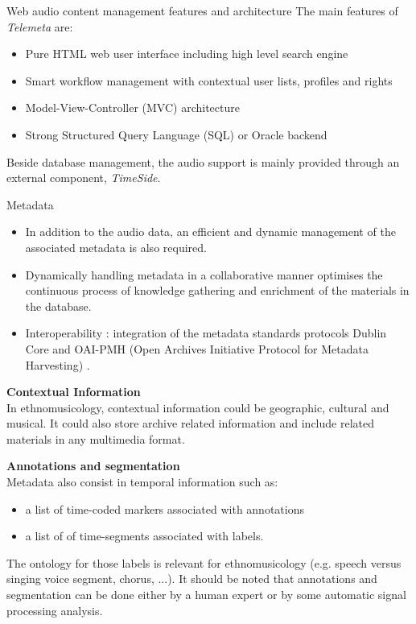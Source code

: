 \documentclass[final, hyperref, table]{beamer}
\begin{document}
\begin{frame}[containsverbatim]{}
\begin{columns}[T]
\begin{column}[T]{.49\linewidth}
\begin{block}{Web audio content management features and architecture}
        The main features of \emph{Telemeta} are:
        \vspace{-0.1cm}
        \begin{itemize}
        \item \alert{Pure HTML} web user interface including high level \alert{search engine}
        \item \alert{Smart workflow management} with contextual user lists, profiles and rights
        \item Model-View-Controller (\alert{MVC}) architecture 
        \item Strong Structured Query Language (\alert{SQL}) or Oracle backend
        \end{itemize}
        Beside database management, the audio support is mainly provided through an external component, \emph{TimeSide}.
        
      \end{block}
      \begin{block}{Metadata}
        \vspace{-0.5cm}
        \begin{itemize}
        \item In addition to the audio data, an efficient and \alert{dynamic
            management} of the associated metadata is also required.
        \item Dynamically handling metadata in a \alert{collaborative} manner optimises
          the continuous process of knowledge gathering and enrichment of
          the materials in the database.
        \item Interoperability : integration of the metadata standards protocols \alert{Dublin Core}
          and \alert{OAI-PMH} (Open Archives Initiative Protocol for Metadata
          Harvesting) \cite{DublinCore,OAI-PMH}.
        \end{itemize}
        
        \textbf{Contextual Information}\\
        In ethnomusicology, contextual information could be geographic, cultural and musical. It could also store archive related information and include related materials in any multimedia format. 
        
        \textbf{Annotations and segmentation}\\
        Metadata also consist in temporal information such as:
        \begin{itemize}
        \item a list of \alert{time-coded markers} associated with annotations
        \item a list of of \alert{time-segments} associated with labels.
        \end{itemize}
        The ontology for those labels is relevant for ethnomusicology (e.g. speech versus singing voice segment, chorus, ...).
        It should be noted that annotations and segmentation can be done either by a human expert or by some automatic signal processing analysis.
      \end{block}
      

\end{column}
\end{columns}
\end{frame}
\end{document}

